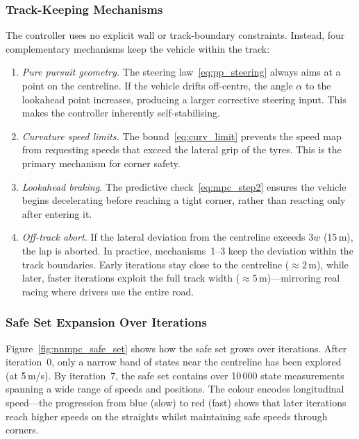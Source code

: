 \subsubsection{Track-Keeping Mechanisms}

The controller uses no explicit wall or track-boundary constraints. Instead, four complementary mechanisms keep the vehicle within the track:
\begin{enumerate}
	\item \emph{Pure pursuit geometry.} The steering law~\eqref{eq:pp_steering} always aims at a point on the centreline. If the vehicle drifts off-centre, the angle $\alpha$ to the lookahead point increases, producing a larger corrective steering input. This makes the controller inherently self-stabilising.

	\item \emph{Curvature speed limits.} The bound~\eqref{eq:curv_limit} prevents the speed map from requesting speeds that exceed the lateral grip of the tyres. This is the primary mechanism for corner safety.

	\item \emph{Lookahead braking.} The predictive check~\eqref{eq:mpc_step2} ensures the vehicle begins decelerating before reaching a tight corner, rather than reacting only after entering it.

	\item \emph{Off-track abort.} If the lateral deviation from the centreline exceeds $3w$ (15\,m), the lap is aborted. In practice, mechanisms~1--3 keep the deviation within the track boundaries. Early iterations stay close to the centreline ($\approx 2$\,m), while later, faster iterations exploit the full track width ($\approx 5$\,m)---mirroring real racing where drivers use the entire road.
\end{enumerate}


\subsubsection{Safe Set Expansion Over Iterations}

Figure~\ref{fig:nnmpc_safe_set} shows how the safe set grows over iterations. After iteration~0, only a narrow band of states near the centreline has been explored (at 5\,m/s). By iteration~7, the safe set contains over 10\,000 state measurements spanning a wide range of speeds and positions. The colour encodes longitudinal speed---the progression from blue (slow) to red (fast) shows that later iterations reach higher speeds on the straights whilst maintaining safe speeds through corners.

